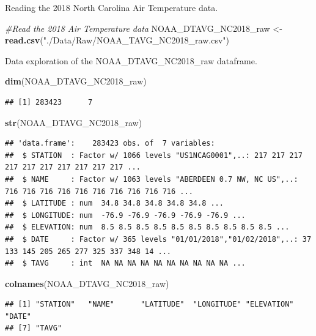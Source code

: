 \documentclass[12pt,]{article}
\newenvironment{Shaded}{\begin{snugshade}}{\end{snugshade}}
\newcommand{\KeywordTok}[1]{\textcolor[rgb]{0.13,0.29,0.53}{\textbf{#1}}}
\newcommand{\StringTok}[1]{\textcolor[rgb]{0.31,0.60,0.02}{#1}}
\newcommand{\CommentTok}[1]{\textcolor[rgb]{0.56,0.35,0.01}{\textit{#1}}}
\newcommand{\NormalTok}[1]{#1}
\begin{document}
Reading the 2018 North Carolina Air Temperature data.

\begin{Shaded}
\begin{Highlighting}[]
\CommentTok{#Read the 2018 Air Temperature data}
\NormalTok{NOAA_DTAVG_NC2018_raw <-}\StringTok{ }\KeywordTok{read.csv}\NormalTok{(}\StringTok{"./Data/Raw/NOAA_TAVG_NC2018_raw.csv"}\NormalTok{)}
\end{Highlighting}
\end{Shaded}

Data exploration of the NOAA\_DTAVG\_NC2018\_raw dataframe.

\begin{Shaded}
\begin{Highlighting}[]
\KeywordTok{dim}\NormalTok{(NOAA_DTAVG_NC2018_raw)}
\end{Highlighting}
\end{Shaded}

\begin{verbatim}
## [1] 283423      7
\end{verbatim}

\begin{Shaded}
\begin{Highlighting}[]
\KeywordTok{str}\NormalTok{(NOAA_DTAVG_NC2018_raw)}
\end{Highlighting}
\end{Shaded}

\begin{verbatim}
## 'data.frame':    283423 obs. of  7 variables:
##  $ STATION  : Factor w/ 1066 levels "US1NCAG0001",..: 217 217 217 217 217 217 217 217 217 217 ...
##  $ NAME     : Factor w/ 1063 levels "ABERDEEN 0.7 NW, NC US",..: 716 716 716 716 716 716 716 716 716 716 ...
##  $ LATITUDE : num  34.8 34.8 34.8 34.8 34.8 ...
##  $ LONGITUDE: num  -76.9 -76.9 -76.9 -76.9 -76.9 ...
##  $ ELEVATION: num  8.5 8.5 8.5 8.5 8.5 8.5 8.5 8.5 8.5 8.5 ...
##  $ DATE     : Factor w/ 365 levels "01/01/2018","01/02/2018",..: 37 133 145 205 265 277 325 337 348 14 ...
##  $ TAVG     : int  NA NA NA NA NA NA NA NA NA NA ...
\end{verbatim}

\begin{Shaded}
\begin{Highlighting}[]
\KeywordTok{colnames}\NormalTok{(NOAA_DTAVG_NC2018_raw)}
\end{Highlighting}
\end{Shaded}

\begin{verbatim}
## [1] "STATION"   "NAME"      "LATITUDE"  "LONGITUDE" "ELEVATION" "DATE"     
## [7] "TAVG"
\end{verbatim}
\end{document}
